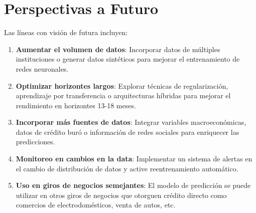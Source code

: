 \section{Perspectivas a Futuro}

Las líneas con visión de futura incluyen:

\begin{enumerate}
    \item \textbf{Aumentar el volumen de datos}: Incorporar datos de múltiples instituciones o generar datos sintéticos para mejorar el entrenamiento de redes neuronales. 
    
    \item \textbf{Optimizar horizontes largos}: Explorar técnicas de regularización, aprendizaje por transferencia o arquitecturas híbridas para mejorar el rendimiento en horizontes 13-18 meses.
    
    \item \textbf{Incorporar más fuentes de datos}: Integrar variables macroeconómicas, datos de crédito buró o información de redes sociales para enriquecer las predicciones.
    
    \item \textbf{Monitoreo en cambios en la data}: Implementar un sistema de alertas en el cambio de distribución de datos y active reentrenamiento automático.
    
    \item \textbf{Uso en giros de negocios semejantes}: El modelo de predicción se puede utilizar en otros giros de negocios que otorguen crédito directo como comercios de electrodomésticos, venta de autos, etc.
\end{enumerate}
